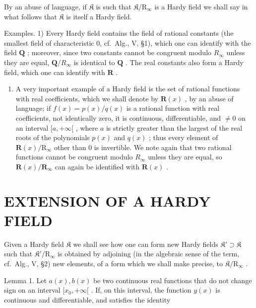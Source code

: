 By an abuse of language, if \(\mathfrak{K}\) is such that \(\mathfrak{K} / \mathrm{R}_{\infty}\) is a Hardy field we shall say in what follows that \(\mathfrak{K}\) is itself a Hardy field.

Examples. 1) Every Hardy field contains the field of rational constants (the smallest field of characteristic 0, cf.~Alg., V, §1), which one can identify with the field \(\mathbf{Q}\) ; moreover, since two constants cannot be congruent modulo \(R_{\infty}\) unless they are equal, \(\mathbf{Q} / R_{\infty}\) is identical to \(\mathbf{Q}\) . The real constants also form a Hardy field, which one can identify with \(\mathbf{R}\) .

\begin{enumerate}
\def\labelenumi{\arabic{enumi})}
\setcounter{enumi}{1}
\tightlist
\item
  A very important example of a Hardy field is the set of rational functions with real coefficients, which we shall denote by \(\mathbf{R}(x)\) , by an abuse of language; if \(f(x) = p(x)/q(x)\) is a rational function with real coefficients, not identically zero, it is continuous, differentiable, and \(\neq 0\) on an interval \([a, +\infty[\) , where \(a\) is strictly greater than the largest of the real roots of the polynomials \(p(x)\) and \(q(x)\) ; thus every element of \(\mathbf{R}(x)/\mathrm{R}_{\infty}\) other than 0 is invertible. We note again that two rational functions cannot be congruent modulo \(R_{\infty}\) unless they are equal, so \(\mathbf{R}(x)/\mathbf{R}_{\infty}\) can again be identified with \(\mathbf{R}(x)\) .
\end{enumerate}

\section{EXTENSION OF A HARDY FIELD}

Given a Hardy field \(\mathfrak{K}\) we shall see how one can form new Hardy fields \(\mathfrak{K}' \supset \mathfrak{K}\) such that \(\mathfrak{K}' / \mathrm{R}_{\infty}\) is obtained by adjoining (in the algebraic sense of the term, cf.~Alg., V, §2) new elements, of a form which we shall make precise, to \(\mathfrak{K} / \mathrm{R}_{\infty}\) .

Lemma 1. Let \(a(x), b(x)\) be two continuous real functions that do not change sign on an interval \([x_0, +\infty[\) . If, on this interval, the function \(y(x)\) is continuous and differentiable, and satisfies the identity

